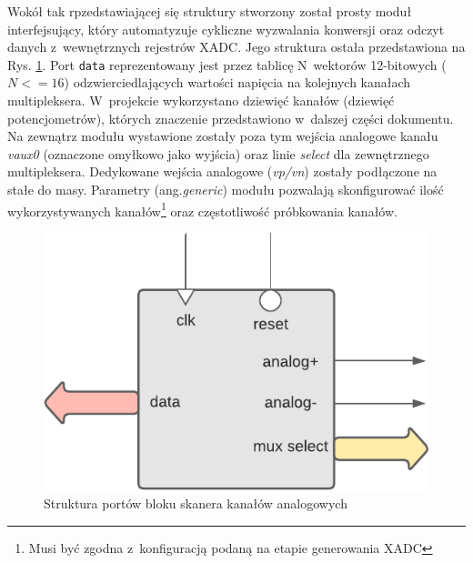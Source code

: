 Wokół tak rpzedstawiającej się struktury stworzony został prosty moduł interfejsujący, który automatyzuje cykliczne wyzwalania konwersji oraz odczyt danych z~wewnętrznych rejestrów XADC. Jego struktura ostała przedstawiona na Rys. \ref{analog-scanner-structure}. Port \verb|data| reprezentowany jest przez tablicę N~wektorów 12-bitowych ($N <= 16$) odzwierciedlających wartości napięcia na kolejnych kanałach multipleksera. W~projekcie wykorzystano dziewięć kanałów (dziewięć potencjometrów), których znaczenie przedstawiono w~dalszej części dokumentu. Na zewnątrz modułu wystawione zostały poza tym wejścia analogowe kanału \textit{vaux0} (oznaczone omyłkowo jako wyjścia) oraz linie \textit{select} dla zewnętrznego multipleksera. Dedykowane wejścia analogowe (\textit{vp/vn}) zostały podłączone na stałe do masy. Parametry (ang.\textit{generic}) modułu pozwalają skonfigurować ilość wykorzystywanych kanałów\footnote{Musi być zgodna z~konfiguracją podaną na etapie generowania XADC} oraz częstotliwość próbkowania kanałów.
 
\vspace{0.5cm}
\begin{figure}[ht]
    \centering
    \includegraphics[scale=1.0]{img/diagrams/analog_scanner.pdf}
    \captionsetup{format=plain,justification=centering}
    \caption{Struktura portów bloku skanera kanałów analogowych}
    \label{analog-scanner-structure}
\end{figure}
\vspace{0.5cm}

